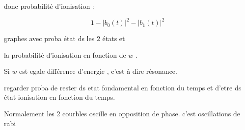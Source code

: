 \documentclass{report}
\begin{document}
donc probabilité d'ionisation :

$$1-\left| b_{0}(t)\right|^2-\left| b_{1}(t)\right|^2$$

graphes avec proba état ds les 2 états et

la probabilité d'ionisation en fonction de  $w$ .



Si $w$ est egale différence d'energie , c'est à dire résonance.

regarder proba de rester ds etat fondamental en fonction du temps et d'etre ds état ionisation en fonction du temps.

Normalement les 2 courbles oscille en opposition de phase.  c'est oscillations de rabi

\end{document}
